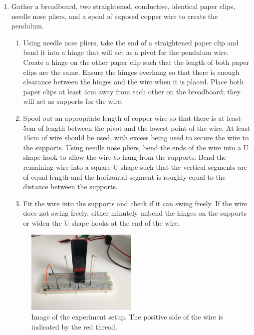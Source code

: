 \begin{enumerate}
	\item Gather a breadboard, two straightened, conductive, identical paper clips, needle nose pliers, and a spool of exposed copper wire to create the pendulum.
	\begin{enumerate}
		\item Using needle nose pliers, take the end of a straightened paper clip and bend it into a hinge that will act as a pivot for the pendulum wire.
		Create a hinge on the other paper clip such that the length of both paper clips are the same.
		Ensure the hinges overhang so that there is enough clearance between the hinges and the wire when it is placed.
		Place both paper clips at least $4\si{\centi\meter}$ away from each other on the breadboard; they will act as supports for the wire.
		\item Spool out an appropriate length of copper wire so that there is at least $5\si{\centi\meter}$ of length between the pivot and the lowest point of the wire.
		At least $15\si{\centi\meter}$ of wire should be used, with excess being used to secure the wire to the supports. 
		Using needle nose pliers, bend the ends of the wire into a U shape hook to allow the wire to hang from the supports.
		Bend the remaining wire into a square U shape such that the vertical segments are of equal length and the horizontal segment is roughly equal to the distance between the supports.
		\item Fit the wire into the supports and check if it can swing freely.
		If the wire does not swing freely, either minutely unbend the hinges on the supports or widen the U shape hooks at the end of the wire.
	\end{enumerate}
	\begin{figure}[H]
		\centering
		\includegraphics[width=0.5\textwidth]{figures/IMG_5514.JPG}
		\caption{Image of the experiment setup. The positive side of the wire is indicated by the red thread.}
		\label{fig:apparatus}
	\end{figure}

\end{enumerate}
